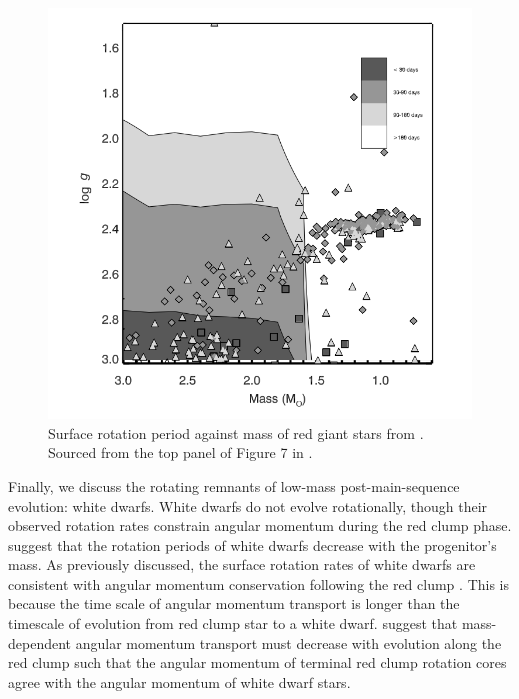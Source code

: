 \begin{figure}[h]
    \includegraphics[width=\textwidth]{Figures/intro_figures/rgb_surface.png}
    \caption{Surface rotation period against mass of red giant stars from \citet{ceillier_surface_2017}.
    Sourced from the top panel of Figure 7 in \citep{ceillier_surface_2017}.}
    \label{fig:rgb_surface}
\end{figure}

Finally, we discuss the rotating remnants of low-mass post-main-sequence evolution: white dwarfs.
White dwarfs do not evolve rotationally, though their observed rotation rates constrain angular momentum during the red clump phase.
\citet{hermes_white_2017} suggest that the rotation periods of white dwarfs decrease with the progenitor's mass.
As previously discussed, the surface rotation rates of white dwarfs are consistent with angular momentum conservation following the red clump \citep{den_hartogh_constraining_2019, cantiello_angular_2014}.
This is because the time scale of angular momentum transport is longer than the timescale of evolution from red clump star to a white dwarf.
\citet{den_hartogh_constraining_2019} suggest that mass-dependent angular momentum transport must decrease with evolution along the red clump such that the angular momentum of terminal red clump rotation cores agree with the angular momentum of white dwarf stars.


